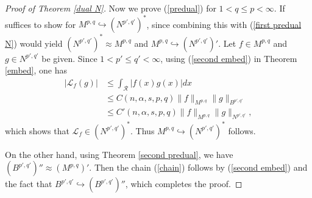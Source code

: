 \documentclass[10pt,reqno]{amsart}
\numberwithin{equation}{section}
\begin{document}
\begin{proof}[Proof of Theorem \ref{dual N}]
Now we prove (\ref{predual}) for $1<q\leq p<\infty$. If suffices to show for $M^{p,q}\hookrightarrow(N^{p',q'})^{\ast}$, since combining this with (\ref{first predual N}) would yield $(N^{p',q'})^{\ast}\approx M^{p,q}$ and  $M^{p,q}\hookrightarrow(N^{p',q'})'$. Let $f\in M^{p,q}$ and $g\in N^{p',q'}$ be given. Since $1<p'\leq q'<\infty$, using (\ref{second embed}) in Theorem \ref{embed}, one has 
\begin{align*}
|\mathcal{L}_{f}(g)|&\leq\int_{\mathcal{R}}|f(x)g(x)|dx\\
&\leq C(n,\alpha,s,p,q)\|f\|_{M^{p,q}}\|g\|_{B^{p',q'}}\\
&\leq C'(n,\alpha,s,p,q)\|f\|_{M^{p,q}}\|g\|_{N^{p',q'}},
\end{align*}
which shows that $\mathcal{L}_{f}\in(N^{p',q'})^{\ast}$. Thus $M^{p,q}\hookrightarrow(N^{p',q'})^{\ast}$ follows. 

On the other hand, using Theorem \ref{second predual}, we have $(B^{p',q'})''\approx(M^{p,q})'$. Then the chain (\ref{chain}) follows by (\ref{second embed}) and the fact that $B^{p',q'}\hookrightarrow(B^{p',q'})''$, which completes the proof.
\end{proof}
\end{document}
